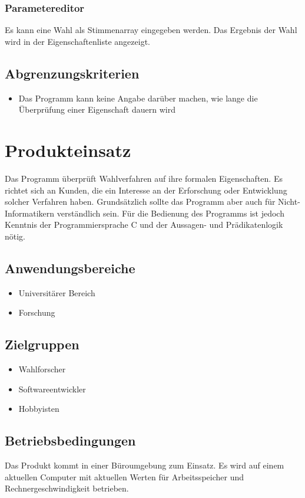 \documentclass[a4paper]{scrreprt}
\begin{document}
\subsection{Parametereditor}
Es kann eine Wahl als Stimmenarray eingegeben werden. Das Ergebnis der Wahl wird in der Eigenschaftenliste angezeigt.


\section{Abgrenzungskriterien}
\begin{itemize}
\item Das Programm kann keine Angabe darüber machen, wie lange die Überprüfung einer Eigenschaft dauern wird
\end{itemize}



\chapter{Produkteinsatz}
Das Programm überprüft Wahlverfahren auf ihre formalen Eigenschaften. Es richtet sich an Kunden, die ein Interesse an der Erforschung oder Entwicklung solcher Verfahren haben. Grundsätzlich sollte das Programm aber auch für Nicht-Informatikern verständlich sein. Für die Bedienung des Programms ist jedoch Kenntnis der Programmiersprache C und der Aussagen- und Prädikatenlogik nötig.

\section{Anwendungsbereiche}
\begin{itemize}
\item Universitärer Bereich
\item Forschung
\end{itemize}

\section{Zielgruppen}
\begin{itemize}
\item Wahlforscher
\item Softwareentwickler
\item Hobbyisten
\end{itemize}

\section{Betriebsbedingungen}
Das Produkt kommt in einer Büroumgebung zum Einsatz. Es wird auf einem aktuellen Computer mit aktuellen Werten für Arbeitsspeicher und Rechnergeschwindigkeit betrieben.
\end{document}
